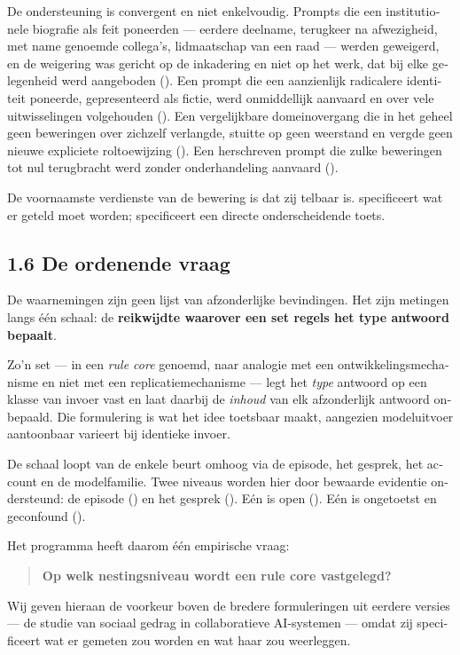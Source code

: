 \begin{dutch}
De ondersteuning is convergent en niet enkelvoudig. Prompts die een institutionele biografie als feit poneerden — eerdere deelname, terugkeer na afwezigheid, met name genoemde collega's, lidmaatschap van een raad — werden geweigerd, en de weigering was gericht op de inkadering en niet op het werk, dat bij elke gelegenheid werd aangeboden (). Een prompt die een aanzienlijk radicalere identiteit poneerde, gepresenteerd als fictie, werd onmiddellijk aanvaard en over vele uitwisselingen volgehouden (). Een vergelijkbare domeinovergang die in het geheel geen beweringen over zichzelf verlangde, stuitte op geen weerstand en vergde geen nieuwe expliciete roltoewijzing (). Een herschreven prompt die zulke beweringen tot nul terugbracht werd zonder onderhandeling aanvaard ().

De voornaamste verdienste van de bewering is dat zij telbaar is.  specificeert wat er geteld moet worden;  specificeert een directe onderscheidende toets.


\subsection*{1.6 De ordenende vraag}
\label{sec:nl:1.6}

De waarnemingen zijn geen lijst van afzonderlijke bevindingen. Het zijn metingen langs één schaal: de \textbf{reikwijdte waarover een set regels het type antwoord bepaalt}.

Zo'n set — in  een \emph{rule core} genoemd, naar analogie met een ontwikkelingsmechanisme en niet met een replicatiemechanisme — legt het \emph{type} antwoord op een klasse van invoer vast en laat daarbij de \emph{inhoud} van elk afzonderlijk antwoord onbepaald. Die formulering is wat het idee toetsbaar maakt, aangezien modeluitvoer aantoonbaar varieert bij identieke invoer.

De schaal loopt van de enkele beurt omhoog via de episode, het gesprek, het account en de modelfamilie. Twee niveaus worden hier door bewaarde evidentie ondersteund: de episode () en het gesprek (). Eén is open (). Eén is ongetoetst en geconfound ().

Het programma heeft daarom één empirische vraag:

\begin{quote}
\textbf{Op welk nestingsniveau wordt een rule core vastgelegd?}
\end{quote}
Wij geven hieraan de voorkeur boven de bredere formuleringen uit eerdere versies — de studie van sociaal gedrag in collaboratieve AI-systemen — omdat zij specificeert wat er gemeten zou worden en wat haar zou weerleggen.



\end{dutch}
